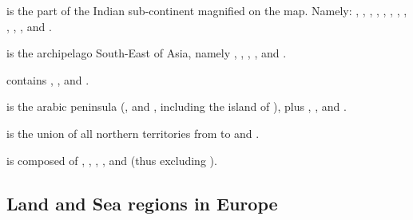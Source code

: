 \begin{deflist}
\item[\anchorcontinent{India}] is the part of the Indian sub-continent
  magnified on the map. Namely: \granderegionDelhi, \granderegionAoudh,
  \granderegionBengale, \granderegionGujarat, \granderegionPendjab,
  \granderegionIndus, \granderegionOrissa, \granderegionGondwana,
  \granderegionMumbai, \granderegionHyderabad, \granderegionMalabar,
  \granderegionKarnatika and .
\item[\anchorcontinent{Indonesia}] is the archipelago South-East of Asia,
  namely , , ,
  ,  and .
\item[\anchorcontinent{Indochina}] contains \granderegionBirmanie,
  \granderegionMalacca, \granderegionAyutthaya and .
\item[\anchorcontinent{Middle East}] is the arabic peninsula
  (\granderegionNedj, \granderegionOman and \granderegionAden, including the
  island of \provinceSocotra), plus \provinceOrmus,
  ,  and
  .
\item[\anchorcontinent{Siberia}] is the union of all northern territories from
   to  and .
\item[\anchorcontinent{Asia}] is composed of ,
  \continentIndia, \continentIndochina, ,
  \continentIndonesia and \granderegionOceania (thus excluding
  \continentSiberia).
\end{deflist}



\subsection{Land and Sea regions in Europe}

